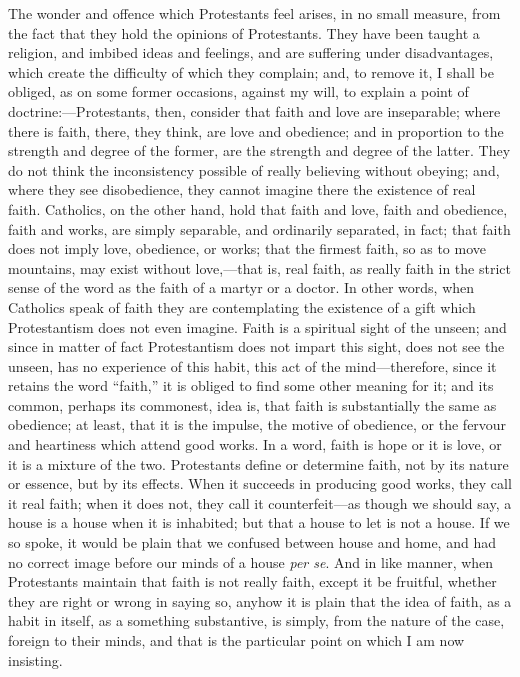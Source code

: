 The wonder and offence which Protestants feel arises, in no small
measure, from the fact that they hold the opinions of Protestants.
They have been taught a religion, and imbibed ideas and feelings, and
are suffering under disadvantages, which create the difficulty of
which they complain; and, to remove it, I shall be obliged, as on some
former occasions, against my will, to explain a point of doctrine:—Protestants, then, consider that faith and love are
inseparable; where there is faith, there, they think, are love and
obedience; and in proportion to the strength and degree of the former,
are the strength and degree of the latter. They do not think the
inconsistency possible of really believing without obeying; and, where
they see disobedience, they cannot imagine there the existence of real
faith. Catholics, on the other hand, hold that faith and love, faith
and obedience, faith and works, are simply separable, and ordinarily
separated, in fact; that faith does not imply love, obedience, or
works; that the firmest faith, so as to move mountains, may exist
without love,—that is, real faith, as really faith in the strict
sense of the word as the faith of a martyr or a doctor. In other
words, when Catholics speak of faith they are contemplating the
existence of a gift which Protestantism does not even imagine. Faith
is a spiritual sight of the unseen; and since in matter of fact
Protestantism does not impart this sight, does not see the unseen, has
no experience of this habit, this act of the mind—therefore, since it
retains the word ``faith,'' it is obliged to find some other
meaning for it; and its common, perhaps its commonest, idea is, that
faith is substantially the same as obedience; at least, that it is the
impulse, the motive of obedience, or the fervour and heartiness which
attend good works. In a word, faith is hope or it is love, or it is a
mixture of the two. Protestants define or determine faith, not by its
nature or essence, but by its effects. When it succeeds in producing
good works, they call it real faith; when it does not, they call it
counterfeit—as though we should say, a house is a house when it is
inhabited; but that a house to let is not a house. If we so spoke, it
would be plain that we confused between house and home, and had no
correct image before our minds of a house \emph{per se}. And in like
manner, when Protestants maintain that faith is not really faith,
except it be fruitful, whether they are right or wrong in saying so,
anyhow it is plain that the idea of faith, as a habit in itself, as a
something substantive, is simply, from the nature of the case, foreign
to their minds, and that is the particular point on which I am now
insisting.

